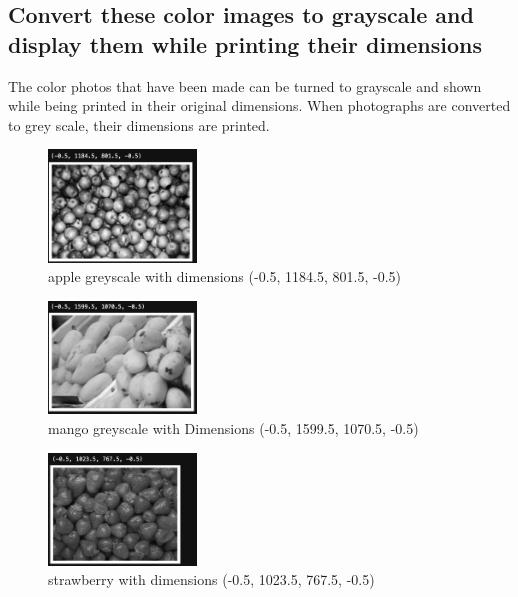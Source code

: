 \documentclass[conference]{IEEEtran}
\begin{document}
\subsection{Convert these color images to grayscale and display them while printing their dimensions}

The color photos that have been made can be turned to grayscale and shown while being printed in their original dimensions. When photographs are converted to grey scale, their dimensions are printed.



\begin{figure}[!htbp]
    \centering
    \includegraphics[height=3cm]{apple_bw.png}
     \caption{apple greyscale with dimensions (-0.5, 1184.5, 801.5, -0.5)}
  \label{fig:AppleGrey}
   
\end{figure}

\begin{figure}[!htbp]
    \centering
    \includegraphics[height=3cm]{mango_bw.png}
     \caption{mango greyscale with Dimensions (-0.5, 1599.5, 1070.5, -0.5)}
  \label{fig:AppleGrey Dimension }
    
\end{figure}

\begin{figure}[!htbp]
    \centering
    \includegraphics[height=3cm]{strawberry_bw.png}
   \caption{strawberry with dimensions (-0.5, 1023.5, 767.5, -0.5) }
  \label{fig:mangoGrey  }
    \label{fig:my_label}
\end{figure}
\end{document}
